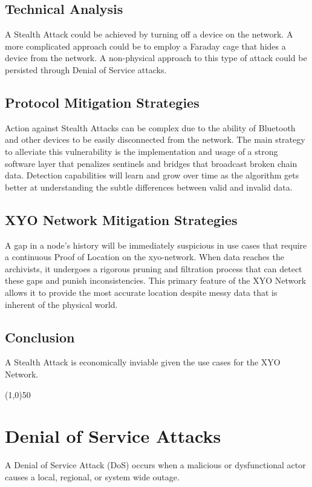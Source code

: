 \documentclass{article}
\begin{document}
\subsection{Technical Analysis}
A Stealth Attack could be achieved by turning off a device on the network. A more complicated approach could be to employ a Faraday cage that hides a device from the network. A non-physical approach to this type of attack could be persisted through Denial of Service attacks. 

\subsection{Protocol Mitigation Strategies}
Action against Stealth Attacks can be complex due to the ability of Bluetooth and other devices to be easily disconnected from the network. The main strategy to alleviate this vulnerability is the implementation and usage of a strong software layer that penalizes \Glspl{sentinel} and \Glspl{bridge} that broadcast broken chain data. Detection capabilities will learn and grow over time as the algorithm gets better at understanding the subtle differences between valid and invalid data.

\subsection{XYO Network Mitigation Strategies}
A gap in a node's history will be immediately suspicious in use cases that require a continuous Proof of Location on the \Gls{xyo-network}. When data reaches the \Glspl{archivist}, it undergoes a rigorous pruning and filtration process that can detect these gaps and punish inconsistencies. This primary feature of the XYO Network allows it to provide the most accurate location despite messy data that is inherent of the physical world. 

\subsection{Conclusion}
A Stealth Attack is economically inviable given the use cases for the XYO Network.

\begin{center}
\line(1,0){50}
\end{center}

\section{Denial of Service Attacks}
A Denial of Service Attack (DoS) occurs when a malicious or dysfunctional actor causes a local, regional, or system wide outage. 
\end{document}
